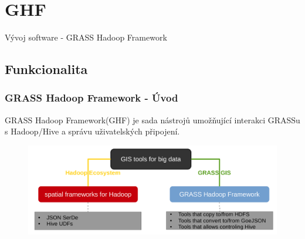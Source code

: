 \documentclass[unicode,bookmarksnumbered]{beamer}
\begin{document}
	\section{GHF}
	\begin{frame}[c]
		\begin{center}	
		\Huge Vývoj software - GRASS Hadoop Framework
		\end{center}
	\end{frame}
	\subsection{Funkcionalita}
	\begin{frame}
		\frametitle{GRASS Hadoop Framework - Úvod}
		GRASS Hadoop Framework(GHF) je sada nástrojů umožňující interakci GRASSu s Hadoop/Hive a správu uživatelských připojení. 
		
		\begin{figure}
			\centering
			\includegraphics[width=1\textwidth]{./img/ghf/idea_schema.pdf}
		\end{figure}
	\end{frame}
	
	
			
\end{document}
